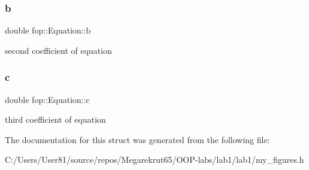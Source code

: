 \subsubsection{\texorpdfstring{b}{b}}
{\footnotesize\ttfamily double fop\+::\+Equation\+::b}

second coefficient of equation \mbox{\label{structfop_1_1_equation_a795ea1202f12b407544c305d79e39872}} 
\subsubsection{\texorpdfstring{c}{c}}
{\footnotesize\ttfamily double fop\+::\+Equation\+::c}

third coefficient of equation 

The documentation for this struct was generated from the following file\+:\begin{DoxyCompactItemize}
\item 
C\+:/\+Users/\+User81/source/repos/\+Megarekrut65/\+O\+O\+P-\/labs/lab1/lab1/my\+\_\+figures.\+h\end{DoxyCompactItemize}
